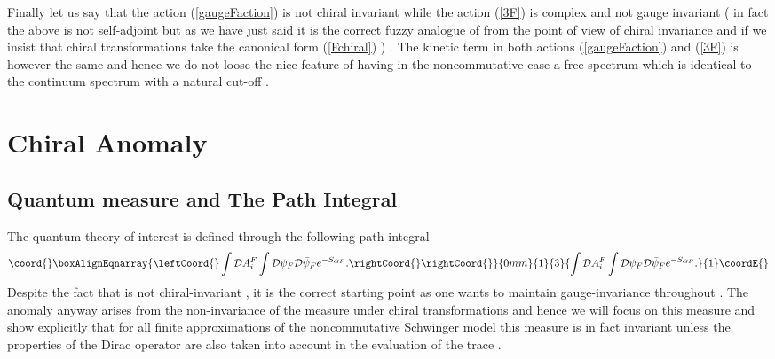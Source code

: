 \documentclass[a4paper,10pt]{article}
\begin{document}
Finally let us say that the action (\ref{gaugeFaction}) is not
chiral invariant while the action (\ref{3F}) is complex and not
gauge invariant ( in fact the above \coordHE{} is not self-adjoint
but as we have just said it is the correct fuzzy analogue of
\coordHE{} from the point of view of chiral invariance and if
we insist that chiral transformations take the canonical form
(\ref{Fchiral}) ) . The kinetic term in both actions
(\ref{gaugeFaction}) and (\ref{3F}) is however the same and hence
we do not loose the nice feature of having in the noncommutative
case a free spectrum which is identical to the continuum spectrum
with a natural cut-off .
\section{Chiral Anomaly}
\subsection{Quantum measure and The Path Integral} The quantum
theory of interest is defined through the following path integral
\begin{eqnarray}\coord{}\boxAlignEqnarray{\leftCoord{}
\int{\cal D}A_i^F\int {\cal D}{{\psi}_{F}}{\cal
D}\bar{{\psi}}_{F}e^{-S_{GF}}.\rightCoord{}\label{par}
\rightCoord{}}{0mm}{1}{3}{
\int{\cal D}A_i^F\int {\cal D}{{\psi}_{F}}{\cal
D}\bar{{\psi}}_{F}e^{-S_{GF}}.}{1}\coordE{}\end{eqnarray}
Despite the fact that \coordHE{} is not chiral-invariant , it is
the correct starting point as one wants to maintain
gauge-invariance throughout . The anomaly anyway arises from the
non-invariance of the measure under chiral transformations
\cite{fujikawa} and hence we will focus on  this measure and show
explicitly that for all finite approximations of the
noncommutative Schwinger model this measure is in fact invariant
unless the properties of the Dirac operator \coordHE{} are also
taken into account in the evaluation of the trace .
\end{document}

